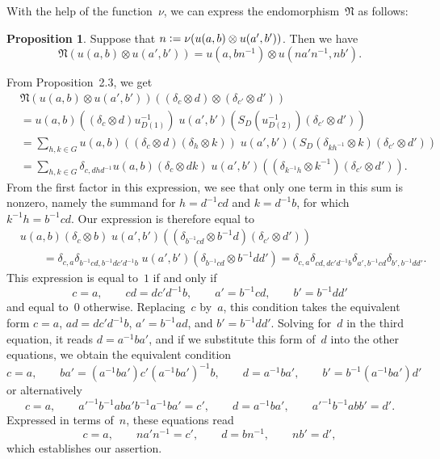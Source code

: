 \documentclass[12pt]{article}
\makeatletter
\theoremstyle{definition}
\newtheorem{Proposition}[Satz]{Proposition}
\theoremstyle{break}
\renewenvironment{proof}[1][\proofname]{\par
\vspace{-5pt}%
\pushQED{\qed}%
\normalfont
\topsep0pt \partopsep0pt %
\trivlist
\item[\hskip\labelsep
\bfseries
#1\@addpunct{.}]\ignorespaces
}{%
\popQED\endtrivlist\@endpefalse
\addvspace{6pt plus 6pt} %
}
\newcommand{\fN}{\mathfrak{N}}
\renewcommand{\1}{\mathbbm{1}}
\newcommand{\ot}{\mathbin{\otimes}}
\newcommand{\uu}{u}
\newcommand{\n}{\nu}
\newcommand{\deq}{\vcentcolon =}
\makeatother
\begin{document}
With the help of the function~$\n$, we can express the endomorphism~$\fN$ as follows:
\begin{Proposition} \label{FormN}
Suppose that $n \deq \n(\uu(a,b) \ot \uu(a',b'))$. Then we have
\[\fN(\uu(a,b) \ot \uu(a',b')) = \uu(a, b n^{-1}) \ot \uu(n a' n^{-1}, n b').\]
\end{Proposition}
\begin{proof}
From Proposition~2.3, we get
\begin{align*}
&\fN(\uu(a,b) \ot \uu(a',b'))((\delta_c \ot d) \ot (\delta_{c'} \ot d')) \\
&= \uu(a,b)((\delta_c \ot d) u_{D (1)}^{-1}) \;
\uu(a',b')(S_D(u_{D (2)}^{-1})(\delta_{c'} \ot d')) \\
&= \sum_{h,k \in G} \uu(a,b)((\delta_c \ot d) (\delta_{h} \ot k)) \;
\uu(a',b')(S_D(\delta_{k h^{-1}} \ot k)(\delta_{c'} \ot d'))  \\
&= \sum_{h,k \in G} \delta_{c,dhd^{-1}} \uu(a,b)(\delta_c \ot dk) \;
\uu(a',b')((\delta_{k^{-1} h} \ot k^{-1})(\delta_{c'} \ot d')).
\end{align*}
From the first factor in this expression, we see that only one term in this sum is nonzero, namely the summand for $h=d^{-1}cd$ and $k=d^{-1}b$, for which $k^{-1} h = b^{-1} c d$. Our expression is therefore equal to
\begin{align*}
&\uu(a,b)(\delta_c \ot b) \;
\uu(a',b')((\delta_{b^{-1} c d} \ot b^{-1} d)(\delta_{c'} \ot d')) \\
&\qquad = \delta_{c,a} \delta_{b^{-1} c d, b^{-1} d c' d^{-1} b}\;
\uu(a',b') (\delta_{b^{-1} c d} \ot b^{-1} d d')
= \delta_{c,a} \delta_{c d, d c' d^{-1} b} \delta_{a', b^{-1} c d} \delta_{b', b^{-1} d d'}.
\end{align*}
This expression is equal to~$1$ if and only if 
\[c = a, \qquad c d = d c' d^{-1} b, \qquad a' = b^{-1} c d, \qquad b' = b^{-1} d d' \]
and equal to~$0$ otherwise. Replacing~$c$ by~$a$, this condition takes the equivalent form
$c = a$, $a d = d c' d^{-1} b$, $a' = b^{-1} a d$, and $b' = b^{-1} d d'$. Solving for~$d$ in the third equation, it reads $d = a^{-1} b a'$, and if we substitute this form of~$d$ into the other equations, we obtain the equivalent condition
\[c = a, \qquad b a' = (a^{-1} b a') c' (a^{-1} b a')^{-1} b, \qquad d = a^{-1} b a', \qquad 
b' = b^{-1} (a^{-1} b a') d' \]
or alternatively 
\[c = a, \qquad a'^{-1} b^{-1} a b a' b^{-1} a^{-1} b a' = c', \qquad d = a^{-1} b a', \qquad 
a'^{-1} b^{-1} a b b' = d'. \]
Expressed in terms of~$n$, these equations read
\[c = a, \qquad n a' n^{-1} = c', \qquad d = b n^{-1}, \qquad n b' = d', \]
which establishes our assertion.
\end{proof}
\end{document}
